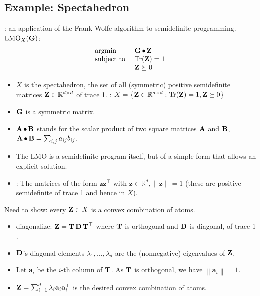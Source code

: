 \subsection*{Example: Spectahedron}
: an application of the Frank-Wolfe algorithm to semidefinite programming.
$\operatorname{LMO}_{X}(\G)$:
$$
\begin{array}{ll}
\operatorname{argmin} & \G \bullet \Z \\
\text {subject to } & \operatorname{Tr}(\Z)=1 \\
& \Z \succeq 0
\end{array}
$$
\begin{itemize}[leftmargin=*]
    \item $X$ is the spectahedron, the set of all (symmetric) positive semidefinite matrices $\Z \in \mathbb{R}^{d \times d}$ of trace 1.
    : $X=\left\{\Z \in \mathbb{R}^{d \times d}: \operatorname{Tr}(\Z)=1, \Z \succeq 0\right\}$
    \item $\G$ is a symmetric matrix.
    \item $\A \bullet \B$ stands for the scalar product of two square matrices $\A$ and $\B$, $\A \bullet \B=\sum_{i, j} a_{i j} b_{i j}$.
    \item The LMO is a semidefinite program itself, but of a simple form that allows an explicit solution.
    \item {}: The matrices of the form $\mathbf{z z}^{\top}$ with $\mathbf{z} \in \mathbb{R}^{d},\|\mathbf{z}\|=1$ (these are positive semidefinite of trace 1 and hence in $X$).
\end{itemize}
Need to show: every $\Z \in X$ is a convex combination of atoms.
\begin{itemize}[leftmargin=*]
    \item diagonalize: $\Z=\T \D \T^{\top}$ where $\T$ is orthogonal and $\D$ is diagonal, of trace 1 .
    \item $\D$'s diagonal elements $\lambda_{1}, \ldots, \lambda_{d}$ are the (nonnegative) eigenvalues of $\Z$.
    \item Let $\mathbf{a}_{i}$ be the $i$-th column of $\T$. As $\T$ is orthogonal, we have $\left\|\mathbf{a}_{i}\right\|=1$.
    \item $\Z=\sum_{i=1}^{d} \lambda_{i} \mathbf{a}_{i} \mathbf{a}_{i}^{\top}$ is the desired convex combination of atoms.
\end{itemize}








